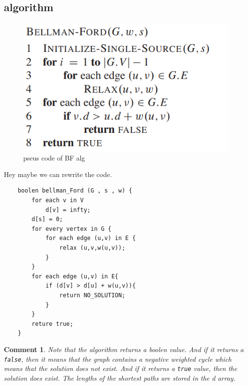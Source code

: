 \documentclass[a4paper, 10pt]{ctexart} %
\newtheorem{corollary}{Comment}
\begin{document}
\subsection{algorithm}
\begin{figure}[H]
    \centering
    \includegraphics[scale = 0.5]{sssp5.png}
    \caption{pseus code of BF alg}
    \label{fig:bfcode}
\end{figure}
Hey maybe we can rewrite the code.
\begin{verbatim}
    boolen bellman_Ford (G , s , w) {
        for each v in V 
            d[v] = infty;
        d[s] = 0;
        for every vertex in G {
            for each edge (u,v) in E {
                relax (u,v,w(u,v));
            }
        }
        for each edge (u,v) in E{
            if (d[v] > d[u] + w(u,v)){
                return NO_SOLUTION;
            }
        }
        reture true;
    }
\end{verbatim}
\begin{corollary}
Note that the algorithm returns a boolen 
value. And if it returns a \verb|false|, then 
it means that the 
graph contains a negative weighted 
cycle which means that 
the solution does not 
exist. And if it returns a \verb|true| value, 
then the solution does exist. The lengths of the shortest paths
are stored in the d array.
\end{corollary}
\end{document}
